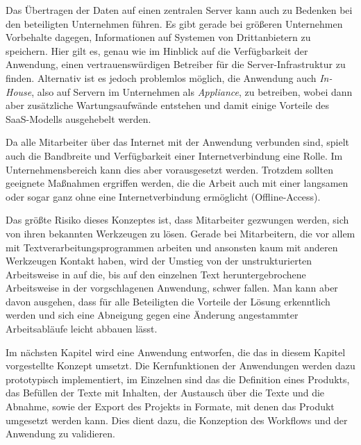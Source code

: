 Das Übertragen der Daten auf einen zentralen Server kann auch zu Bedenken bei den beteiligten Unternehmen führen. Es gibt gerade bei größeren Unternehmen Vorbehalte dagegen, Informationen auf Systemen von Drittanbietern zu speichern. Hier gilt es, genau wie im Hinblick auf die Verfügbarkeit der Anwendung, einen vertrauenswürdigen Betreiber für die Server-Infrastruktur zu finden. Alternativ ist es jedoch problemlos möglich, die Anwendung auch \emph{In-House}, also auf Servern im Unternehmen als \emph{Appliance}, zu betreiben, wobei dann aber zusätzliche Wartungsaufwände entstehen und damit einige Vorteile des SaaS-Modells ausgehebelt werden. 

Da alle Mitarbeiter über das Internet mit der Anwendung verbunden sind, spielt auch die Bandbreite und Verfügbarkeit einer Internetverbindung eine Rolle. Im Unternehmensbereich kann dies aber vorausgesetzt werden. Trotzdem sollten geeignete Maßnahmen ergriffen werden, die die Arbeit auch mit einer langsamen oder sogar ganz ohne eine Internetverbindung ermöglicht (Offline-Access).

Das größte Risiko dieses Konzeptes ist, dass Mitarbeiter gezwungen werden, sich von ihren bekannten Werkzeugen zu lösen. Gerade bei Mitarbeitern, die vor allem mit Textverarbeitungsprogrammen arbeiten und ansonsten kaum mit anderen Werkzeugen Kontakt haben, wird der Umstieg von der unstrukturierten Arbeitsweise in  auf die, bis auf den einzelnen Text heruntergebrochene Arbeitsweise in der vorgschlagenen Anwendung, schwer fallen. Man kann aber davon ausgehen, dass für alle Beteiligten die Vorteile der Lösung erkenntlich werden und sich eine Abneigung gegen eine Änderung angestammter Arbeitsabläufe leicht abbauen lässt.

\begin{samepage}

\secbar

Im nächsten Kapitel wird eine Anwendung entworfen, die das in diesem Kapitel vorgestellte Konzept umsetzt. Die Kernfunktionen der Anwendungen werden dazu prototypisch implementiert, im Einzelnen sind das die Definition eines Produkts, das Befüllen der Texte mit Inhalten, der Austausch über die Texte und die Abnahme, sowie der Export des Projekts in Formate, mit denen das Produkt umgesetzt werden kann. Dies dient dazu, die Konzeption des Workflows und der Anwendung zu validieren. 

\end{samepage}

\pagebreak